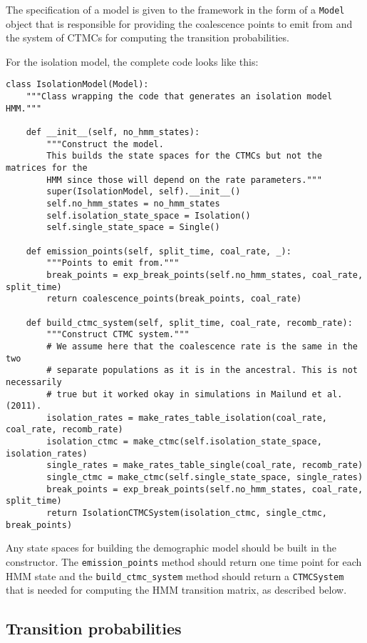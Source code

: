 \documentclass[11pt]{article}
\begin{document}
The specification of a model is given to the framework in the form of a \texttt{Model} object that is responsible for providing the coalescence points to emit from and the system of CTMCs for computing the transition probabilities.

For the isolation model, the complete code looks like this:

\begin{verbatim}
class IsolationModel(Model):
    """Class wrapping the code that generates an isolation model HMM."""

    def __init__(self, no_hmm_states):
        """Construct the model.
        This builds the state spaces for the CTMCs but not the matrices for the
        HMM since those will depend on the rate parameters."""
        super(IsolationModel, self).__init__()
        self.no_hmm_states = no_hmm_states
        self.isolation_state_space = Isolation()
        self.single_state_space = Single()

    def emission_points(self, split_time, coal_rate, _):
        """Points to emit from."""
        break_points = exp_break_points(self.no_hmm_states, coal_rate, split_time)
        return coalescence_points(break_points, coal_rate)

    def build_ctmc_system(self, split_time, coal_rate, recomb_rate):
        """Construct CTMC system."""
        # We assume here that the coalescence rate is the same in the two
        # separate populations as it is in the ancestral. This is not necessarily
        # true but it worked okay in simulations in Mailund et al. (2011).
        isolation_rates = make_rates_table_isolation(coal_rate, coal_rate, recomb_rate)
        isolation_ctmc = make_ctmc(self.isolation_state_space, isolation_rates)
        single_rates = make_rates_table_single(coal_rate, recomb_rate)
        single_ctmc = make_ctmc(self.single_state_space, single_rates)
        break_points = exp_break_points(self.no_hmm_states, coal_rate, split_time)
        return IsolationCTMCSystem(isolation_ctmc, single_ctmc, break_points)
\end{verbatim}

Any state spaces for building the demographic model should be built in the constructor. The \texttt{emission\_points} method should return one time point for each HMM state and the \texttt{build\_ctmc\_system} method should return a \texttt{CTMCSystem} that is needed for computing the HMM transition matrix, as described below.

\subsection{Transition probabilities}
\end{document}
